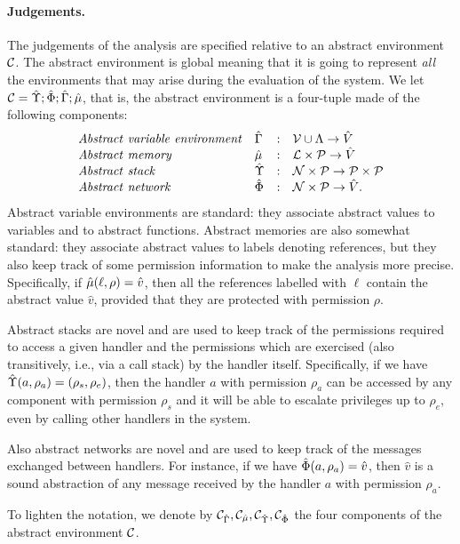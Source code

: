 \paragraph*{Judgements.}  The judgements of the analysis are specified
relative to an abstract environment ${\cal C}$. The abstract environment
is global meaning that it is going to represent \emph{all} the
environments that may arise during the evaluation of the system.
We let ${\cal C}=\hat{\Upsilon} ; \hat{\Phi} ; \hat{\Gamma} ; \hat{\mu}$, that is, the 
abstract environment is a four-tuple made of the following components:
\[
\begin{array}{llcl}
\mathit{Abstract\ variable\ environment} & \hat{\Gamma} & : & \mathcal{V} \cup \Lambda \rightarrow \hat{V} \\
\mathit{Abstract\ memory} & \hat{\mu} & : & {\mathcal L} \times \mathcal{P} \rightarrow \hat{V} \\
\mathit{Abstract\ stack} & \hat{\Upsilon} & : & \mathcal{N} \times \mathcal{P} \rightarrow \mathcal{P} \times \mathcal{P} \\
\mathit{Abstract\ network} & \hat{\Phi} & : & \mathcal{N} \times \mathcal{P} \rightarrow \hat{V}.
\end{array}
\]
Abstract variable environments are standard: they associate abstract values to
variables and to abstract functions. 
Abstract memories are also somewhat standard: they associate abstract
values to labels denoting references, but they also keep track of some permission
information to make the analysis more precise. Specifically, 
if $\hat{\mu}(\ell,\rho) = \hat{v}$, then all the references
labelled with $\ell$ contain the abstract value $\hat{v}$, provided that they
are protected with permission $\rho$.

Abstract stacks are novel and are used to keep track of the
permissions required to access a given handler and the permissions
which are exercised (also transitively, i.e., via a call stack) by the
handler itself. Specifically, if we have $\hat{\Upsilon}(a,\rho_a) =
(\rho_s,\rho_e)$, then the handler $a$ with permission $\rho_a$ can be
accessed by any component with permission $\rho_s$ and it will be
able to escalate privileges up to $\rho_e$, even by calling other handlers 
in the system.

Also abstract networks are novel and are used to keep track of the
messages exchanged between handlers. For instance, if we have
$\hat{\Phi}(a,\rho_a) = \hat{v}$, then $\hat{v}$ is a sound abstraction
of any message received by the handler $a$ with permission $\rho_a$. 

To lighten the notation, we denote by ${\cal C}_{\hat{\Gamma}}, {\cal C}_{\hat{\mu}},
{\cal C}_{\hat{\Upsilon}}, {\cal C}_{\hat{\Phi}}$ the four components of the abstract 
environment ${\cal C}$.
 
